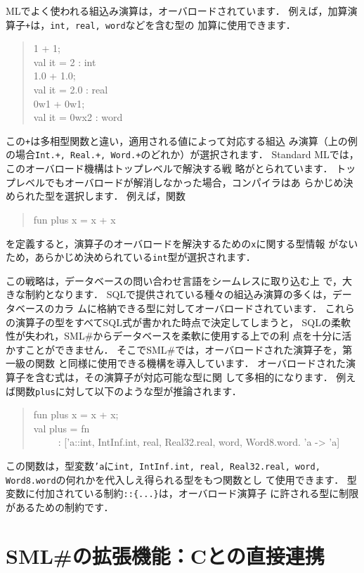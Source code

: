 \documentclass{jbook}
\newcommand{\smlsharp}{SML\#}
\newcommand{\myem}{\ \ \ \ \  }
\begin{document}
	MLでよく使われる組込み演算は，オーバロードされています．
	例えば，加算演算子{\tt +}は，{\tt int, real, word}などを含む型の
加算に使用できます．
\begin{quote}
1 + 1;\\
val it = 2 : int\\
1.0 + 1.0;\\
val it = 2.0 : real\\
0w1 + 0w1;\\
val it = 0wx2 : word
\end{quote}
	この{\tt +}は多相型関数と違い，適用される値によって対応する組込
み演算（上の例の場合{\tt Int.+, Real.+, Word.+}のどれか）が選択されます．
	Standard MLでは，このオーバロード機構はトップレベルで解決する戦
略がとられています．
	トップレベルでもオーバロードが解消しなかった場合，コンパイラはあ
らかじめ決められた型を選択します．
	例えば，関数
\begin{quote}
fun plus x = x + x
\end{quote}
を定義すると，演算子のオーバロードを解決するための{\tt x}に関する型情報
がないため，あらかじめ決められている{\tt int}型が選択されます．
	
	この戦略は，データベースの問い合わせ言語をシームレスに取り込む上
で，大きな制約となります．
	SQLで提供されている種々の組込み演算の多くは，データベースのカラ
ムに格納できる型に対してオーバロードされています．
	これらの演算子の型をすべてSQL式が書かれた時点で決定してしまうと，
SQLの柔軟性が失われ，\smlsharp{}からデータベースを柔軟に使用する上での利
点を十分に活かすことができません．
	そこで\smlsharp{}では，オーバロードされた演算子を，第一級の関数
と同様に使用できる機構を導入しています．
	オーバロードされた演算子を含む式は，その演算子が対応可能な型に関
して多相的になります．
	例えば関数{\tt plus}に対して以下のような型が推論されます．
\begin{quote}
fun plus x = x + x;\\
val plus = fn\\
\myem  : ['a::{int, IntInf.int, real, Real32.real, word, Word8.word}. 'a -> 'a]
\end{quote}
	この関数は，型変数{\tt 'a}に{\tt int, IntInf.int, real,
Real32.real, word, Word8.word}の何れかを代入しえ得られる型をもつ関数とし
て使用できます．
	型変数に付加されている制約{\tt ::\{...\}}は，オーバロード演算子
に許される型に制限があるための制約です．


\chapter{\smlsharp{}の拡張機能：Cとの直接連携}
\label{chap:tutorialCFFI}
\end{document}
